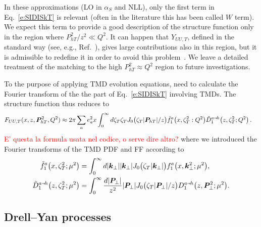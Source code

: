 \documentclass[aps,preprintnumbers,showpacs,nofootinbib,superscriptaddress,floatfix]{revtex4}
\newcommand{\smarrow}{\mbox{\raisebox{-4.5pt}[0pt][0pt]{$\hspace{-1pt} 
		\vec{\phantom{v}}$}}}
\newcommand{\T}{\perp}
\newcommand{\Tperp}{T}
\newcommand{\bT}{\zeta_T}
\begin{document}
In these approximations (LO in $\alpha_S$ and NLL), only the first term in
Eq.~\eqref{e:SIDISkT} is relevant (often in the
literature this has been called $W$ term). We expect this term to provide a
good description of the
structure function only in the region where $P_{hT}^2/z^2 \ll Q^2$. 
It can happen that $Y_{UU,T}$, defined
in the standard way (see, e.g., Ref.~\cite{Collins:1984kg}), gives large
contributions also in this region, but it is admissible to
redefine it in order to avoid this problem~\cite{Collins:2016hqq}. 
We leave a detailed treatment of the matching to the high $P_{hT}^2 \approx Q^2$
region to future investigations.   

To the purpose of applying TMD evolution equations, 
 need to calculate the Fourier transform of the the part of 
Eq.~\eqref{e:SIDISkT} involving TMDs. The structure function thus reduces to 
\begin{align}
\label{e:SIDISkTFF}
   F_{UU,T}(x,z, \bm{P}_{h \Tperp}^2, Q^2) &\approx 2\pi \sum_a e_a^2 x 
       \int_0^{\infty} {d \bT} \bT J_0\big(\bT |\bm{P}_{hT}|/z\big)
      \tilde{f}_1^a\big(x, \bT^2:Q^2\big) \tilde{D}_1^{a\smarrow h}\big(z, \bT^2;
      Q^2 \big) 
\nonumber \, .
\end{align} 
\textcolor{red}{ E' questa la formula usata nel codice, o serve dire altro?}
where we introduced the Fourier transforms of the TMD PDF and FF according to
\begin{align} 
\tilde{f}_1^a\big(x, \bT^2;\mu^2\big) &=
\int_0^{\infty} d |\bm{k}_\T| 
                |\bm{k}_\T|J_0\big(\bT |\bm{k}_\T|\big) 
       f_1^a\big(x, \bm{k}_\T^2;\mu^2\big),
\\
\tilde{D}_1^{a\smarrow h}\big(z, \bT^2; \mu^2 \big) &=
\int_0^{\infty} \frac{d |\bm{P}_{\T}|}{z^2} |\bm{P}_{\T}| 
                                             J_0\big(\bT |\bm{P}_{\T}|/z\big)
       D_1^{a\smarrow h}\big(z, \bm{P}_{\T}^2; \mu^2 \big).
\end{align}  


\subsection{Drell--Yan processes}
\label{ss:DY_formalism}
\end{document}
